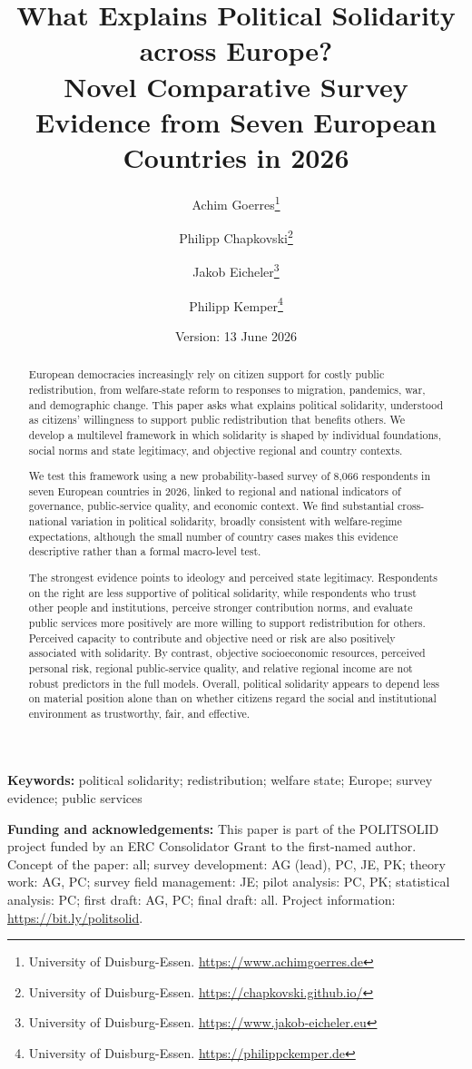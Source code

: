\documentclass[12pt]{article}
\title{What Explains Political Solidarity across Europe?\\
\large Novel Comparative Survey Evidence from Seven European Countries in 2026}
\author{Achim Goerres\thanks{University of Duisburg-Essen. \url{https://www.achimgoerres.de}} \and
Philipp Chapkovski\thanks{University of Duisburg-Essen. \url{https://chapkovski.github.io/}} \and
Jakob Eicheler\thanks{University of Duisburg-Essen. \url{https://www.jakob-eicheler.eu}} \and
Philipp Kemper\thanks{University of Duisburg-Essen. \url{https://philippckemper.de}}}
\date{Version: 13 June 2026}
\begin{document}
\maketitle

\begin{abstract}
European democracies increasingly rely on citizen support for costly public redistribution, from welfare-state reform to responses to migration, pandemics, war, and demographic change. This paper asks what explains political solidarity, understood as citizens' willingness to support public redistribution that benefits others. We develop a multilevel framework in which solidarity is shaped by individual foundations, social norms and state legitimacy, and objective regional and country contexts.

We test this framework using a new probability-based survey of 8,066 respondents in seven European countries in 2026, linked to regional and national indicators of governance, public-service quality, and economic context. We find substantial cross-national variation in political solidarity, broadly consistent with welfare-regime expectations, although the small number of country cases makes this evidence descriptive rather than a formal macro-level test.

The strongest evidence points to ideology and perceived state legitimacy. Respondents on the right are less supportive of political solidarity, while respondents who trust other people and institutions, perceive stronger contribution norms, and evaluate public services more positively are more willing to support redistribution for others. Perceived capacity to contribute and objective need or risk are also positively associated with solidarity. By contrast, objective socioeconomic resources, perceived personal risk, regional public-service quality, and relative regional income are not robust predictors in the full models. Overall, political solidarity appears to depend less on material position alone than on whether citizens regard the social and institutional environment as trustworthy, fair, and effective.
\end{abstract}

\noindent\textbf{Keywords:} political solidarity; redistribution; welfare state; Europe; survey evidence; public services

\vspace{1em}
\noindent\textbf{Funding and acknowledgements:} This paper is part of the POLITSOLID project funded by an ERC Consolidator Grant to the first-named author. Concept of the paper: all; survey development: AG (lead), PC, JE, PK; theory work: AG, PC; survey field management: JE; pilot analysis: PC, PK; statistical analysis: PC; first draft: AG, PC; final draft: all. Project information: \url{https://bit.ly/politsolid}.
\end{document}
